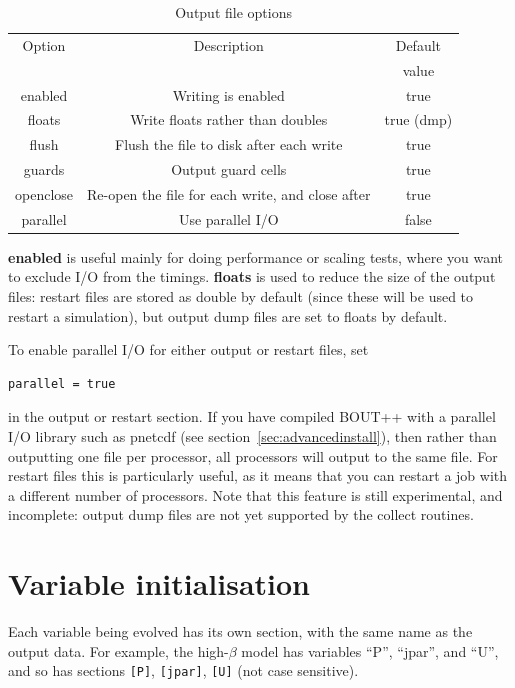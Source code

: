 \documentclass[12pt]{article}
\newcommand{\code}[1]{\texttt{#1}}
\begin{document}
%
\begin{table}[htb!]
\centering
\caption{Output file options}
%
\label{tab:outputopts}
%
\begin{tabular}{c | c | c}
\hline
Option & Description & Default\\
       &             & value\\
\hline
enabled & Writing is enabled & true \\
floats & Write floats rather than doubles & true (dmp)\\
flush & Flush the file to disk after each write & true \\
guards & Output guard cells & true \\
openclose & Re-open the file for each write, and close after & true \\
parallel & Use parallel I/O & false \\
\hline
\end{tabular}
%
\end{table}
%
{\bf enabled} is useful mainly for doing performance or scaling tests, where
you want to exclude I/O from the timings. {\bf floats} is used to reduce the
size of the output files: restart files are stored as double by default (since
these will be used to restart a simulation), but output dump files are set to
floats by default.

To enable parallel I/O for either output or restart files, set
%
\begin{lstlisting}
parallel = true
\end{lstlisting}
%
in the output or restart section. If you have compiled BOUT++ with a parallel
I/O library such as pnetcdf (see section~\ref{sec:advancedinstall}), then
rather than outputting one file per processor, all processors will output to
the same file. For restart files this is particularly useful, as it means that
you can restart a job with a different number of processors.  Note that this
feature is still experimental, and incomplete: output dump files are not yet
supported by the collect routines.





\section{Variable initialisation}
%
%
Each variable being evolved has its own section, with the same name as the
output data. For example, the high-$\beta$ model has variables ``P'', ``jpar'',
and ``U'', and so has sections \code{[P]}, \code{[jpar]}, \code{[U]} (not case
sensitive).
\end{document}
